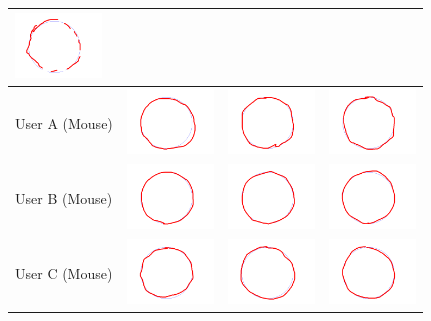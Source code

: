 \begin{tabular}{lccc}
\includegraphics[width=2.3cm]{../experiments/circle_Angus_p_2.png} \\
\midrule
 User A (Mouse)&
\includegraphics[width=2.3cm]{../experiments/circle_Ayaka_p_0_m.png} &
\includegraphics[width=2.3cm]{../experiments/circle_Ayaka_p_1_m.png} &
\includegraphics[width=2.3cm]{../experiments/circle_Ayaka_p_2_m.png} \\
\midrule
 User B (Mouse)&
\includegraphics[width=2.3cm]{../experiments/circle_Takeyo_p_0_m.png} &
\includegraphics[width=2.3cm]{../experiments/circle_Takeyo_p_1_m.png} &
\includegraphics[width=2.3cm]{../experiments/circle_Takeyo_p_2_m.png} \\
\midrule
 User C (Mouse)&
\includegraphics[width=2.3cm]{../experiments/circle_Angus_p_0_m.png} &
\includegraphics[width=2.3cm]{../experiments/circle_Angus_p_1_m.png} &
\includegraphics[width=2.3cm]{../experiments/circle_Angus_p_2_m.png} \\
\bottomrule
\end{tabular}

